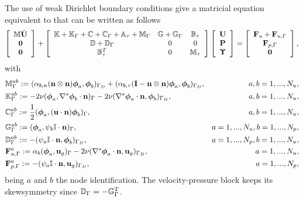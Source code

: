 The use of weak Dirichlet boundary conditions give a matricial equation equivalent to  that can be written as follows
\begin{equation}
\label{eq-C7_NSmatform_weak}
\left[\begin{array}{c}
\mathbb{M}\dot{{\bf U}}\\
\mathbf{0}\\
\mathbf{0}
\end{array}\right]+\left[\begin{array}{ccc}
\mathbb{K}+\mathbb{K}_\Gamma+\mathbb{C}+\mathbb{C}_\Gamma+\mathbb{A}_\tau+\mathbb{M}_\Gamma&\mathbb{G}+\mathbb{G}_\Gamma&\mathbb{B}_\tau\\
\mathbb{D}+\mathbb{D}_\Gamma&0&0\\
\mathbb{B}_\tau^T&0&\mathbb{M}_\tau
\end{array}\right]\left[\begin{array}{c}
{\bf U}\\
{\bf P}\\
\boldsymbol{\Upsilon}
\end{array}\right]=\left[\begin{array}{c}
{\bf F}_u+{\bf F}_{u,\Gamma}\\
{\bf F}_{p,\Gamma}\\
\mathbf{0}
\end{array}\right],
\end{equation}
with 
\begin{align*}
&\mathbb{M}_{\Gamma}^{ab}:=(\alpha_{b,n}({\bf n}\otimes{\bf n})\boldsymbol{\phi}_{a},\boldsymbol{\phi}_{b})_{\Gamma_D}+(\alpha_{b,\tau}(\mathbf{I}-{\bf n}\otimes{\bf n})\boldsymbol{\phi}_{a},\boldsymbol{\phi}_{b})_{\Gamma_D},&a,b=1,...,N_u,\\
&\mathbb{K}_{\Gamma}^{ab}:=-2\nu(\boldsymbol{\phi}_{a},\nabla^s\boldsymbol{\phi}_{b}\cdot{\bf n})_\Gamma-2\nu(\nabla^s\boldsymbol{\phi}_{a}\cdot{\bf n},\boldsymbol{\phi}_{b})_{\Gamma_D},&a,b=1,...,N_u,\\
&\mathbb{C}_{\Gamma}^{ab}:=\frac{1}{2}(\boldsymbol{\phi}_{a},({\bf u}\cdot{\bf n})\boldsymbol{\phi}_{b})_\Gamma,&a,b=1,...,N_u,\\
&\mathbb{G}_{\Gamma}^{ab}:=(\boldsymbol{\phi}_{a},\psi_{b}\mathbb{I}\cdot{\bf n})_\Gamma,&a=1,...,N_u,b=1,...,N_p,\\
&\mathbb{D}_{\Gamma}^{ab}:=-(\psi_{a}\mathbb{I}\cdot{\bf n},\boldsymbol{\phi}_{b})_{\Gamma_D},&a=1,...,N_p,b=1,...,N_u,\\
&{\bf F}_{u,\Gamma}^{a}:=\alpha_b(\boldsymbol{\phi}_{a},{\bf u}_g)_\Gamma-2\nu(\nabla^s\boldsymbol{\phi}_{a}\cdot{\bf n},{\bf u}_g)_{\Gamma_D},&a=1,...,N_u,\\
&{\bf F}_{p,\Gamma}^{a}:=-(\psi_{a}\mathbb{I}\cdot{\bf n},{\bf u}_g)_{\Gamma_D},&a=1,...,N_p,
\end{align*}
being $a$ and $b$ the node identification. The velocity-pressure block keeps its skewsymmetry since $\mathbb{D}_\Gamma=-\mathbb{G}_\Gamma^T$.

